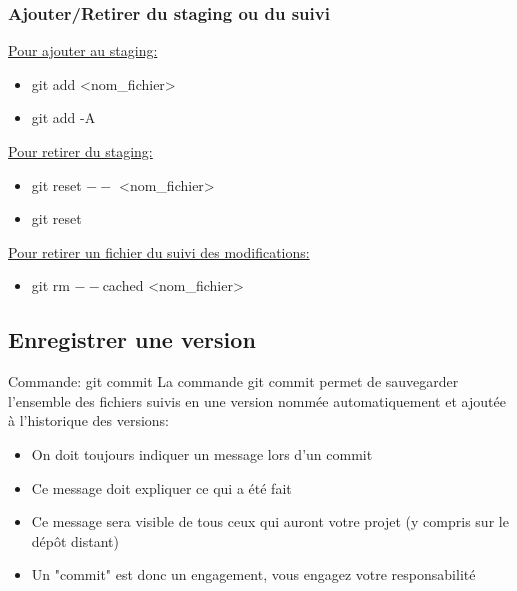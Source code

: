 \documentclass{beamer}
\begin{document}
\begin{frame}
\frametitle{Ajouter/Retirer du staging ou du suivi}

\underline{Pour ajouter au staging:}
\smallskip
\begin{itemize}
    \item[] git add <nom\_fichier>
    \item[] git add -A
\end{itemize}
\bigskip

\underline{Pour retirer du staging:}
\smallskip
\begin{itemize}
    \item[] git reset $--$ <nom\_fichier>
    \item[] git reset
\end{itemize}
\bigskip

\underline{Pour retirer un fichier du suivi des modifications:}
\smallskip
\begin{itemize}
    \item[] git rm $--$cached <nom\_fichier>
\end{itemize}
\end{frame}

\subsection{Enregistrer une version}

\begin{frame}{Commande: git commit}
La commande git commit permet de sauvegarder l'ensemble des fichiers suivis en une version nommée automatiquement et ajoutée à l'historique des versions:
\smallskip
\begin{itemize}
    \item On doit toujours indiquer un message lors d'un commit\\
    \item Ce message doit expliquer ce qui a été fait
    \item Ce message sera visible de tous ceux qui auront votre projet (y compris sur le dépôt distant)
    \item Un "commit" est donc un engagement, vous engagez votre responsabilité
\end{itemize}
\end{frame}
\end{document}
